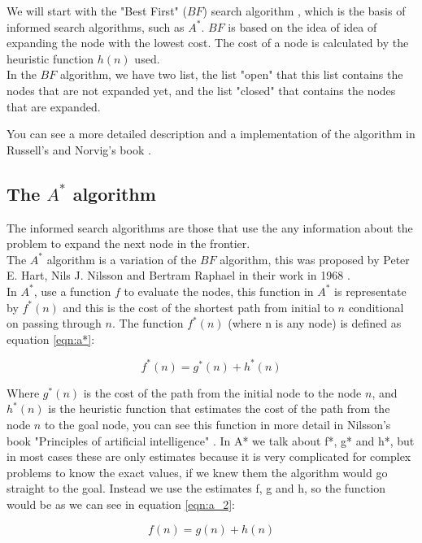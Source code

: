 \documentclass[runningheads]{llncs}
\begin{document}
We will start with the "Best First" (\(BF\)) search algorithm \cite{algorithms}, which is the basis of informed search algorithms, such as \(A^*\).
\(BF\) is based on the idea of idea of expanding the node with the lowest cost. The cost of a node is calculated by the heuristic function \(h(n)\) used. \\
In the \(BF\) algorithm, we have two list, the list "open" that this list contains the nodes that are not expanded yet, and the list "closed" that contains the nodes that are expanded.

You can see a more detailed description and a implementation of the algorithm in Russell's and Norvig's book \cite{algorithms_2}.

\subsection{The \(A^*\) algorithm}
The informed search algorithms are those that use the any information about the problem to expand the next node in the frontier.\\
The \(A^*\) algorithm is a variation of the \(BF\) algorithm, this was proposed by Peter E. Hart, Nils J. Nilsson and Bertram Raphael in their work in 1968 \cite{algorithms_3}.\\
In \(A^*\), use a function \(f\) to evaluate the nodes, this function in \(A^*\) is representate by \(f^*(n)\) and this is the cost of the shortest path from initial to \(n\) conditional on passing through \(n\).
The function \(f^*(n)\) (where n is any node) is defined as equation \ref{eqn:a*}:

\begin{equation}\label{eqn:a*}
f^*(n) = g^*(n) + h^*(n)
\end{equation}

Where \(g^*(n)\) is the cost of the path from the initial node to the node \(n\), and \(h^*(n)\) is the heuristic function that estimates the cost of the path from the node \(n\) to the goal node, you can see this function in more detail in Nilsson's book "Principles of artificial intelligence" \cite{algorithms_4}.
In A* we talk about f*, g* and h*, but in most cases these are only estimates because it is very complicated for complex problems to know the exact values, if we knew them the algorithm would go straight to the goal. Instead we use the estimates f, g and h, so the function would be as we can see in equation \ref{eqn:a_2}:

\begin{equation}\label{eqn:a_2}
f(n) = g(n) + h(n)
\end{equation}
\end{document}
